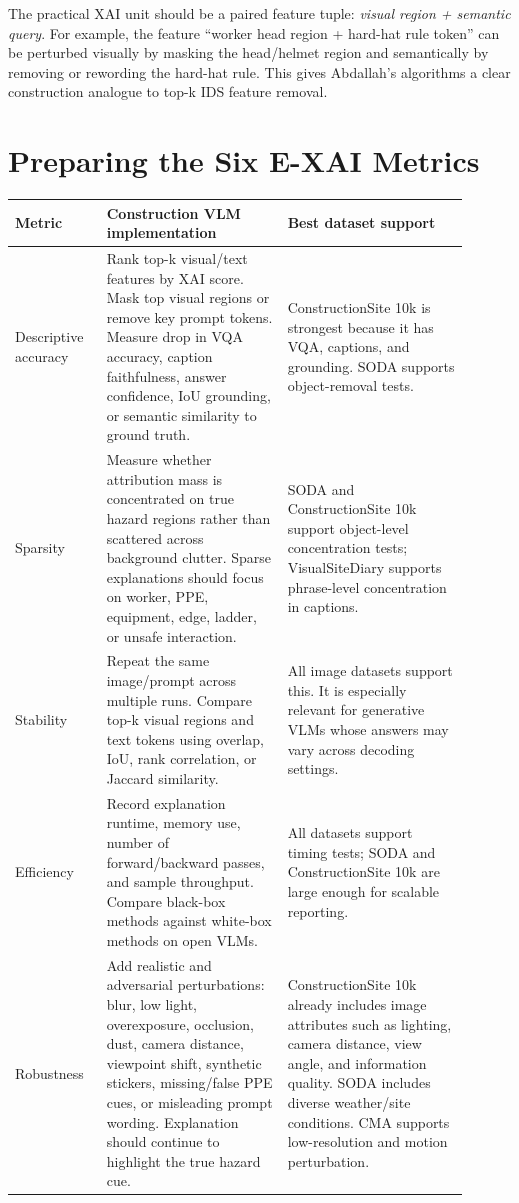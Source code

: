 \documentclass[10pt]{article}
\begin{document}
The practical XAI unit should be a paired feature tuple: \textit{visual region + semantic query}. For example, the feature ``worker head region + hard-hat rule token'' can be perturbed visually by masking the head/helmet region and semantically by removing or rewording the hard-hat rule. This gives Abdallah's algorithms a clear construction analogue to top-k IDS feature removal.

\section{Preparing the Six E-XAI Metrics}
\begin{longtable}{L{0.18\linewidth} L{0.36\linewidth} L{0.36\linewidth}}
\toprule
\textbf{Metric} & \textbf{Construction VLM implementation} & \textbf{Best dataset support} \\
\midrule
\endhead
Descriptive accuracy & Rank top-k visual/text features by XAI score. Mask top visual regions or remove key prompt tokens. Measure drop in VQA accuracy, caption faithfulness, answer confidence, IoU grounding, or semantic similarity to ground truth. & ConstructionSite 10k is strongest because it has VQA, captions, and grounding. SODA supports object-removal tests. \\
\midrule
Sparsity & Measure whether attribution mass is concentrated on true hazard regions rather than scattered across background clutter. Sparse explanations should focus on worker, PPE, equipment, edge, ladder, or unsafe interaction. & SODA and ConstructionSite 10k support object-level concentration tests; VisualSiteDiary supports phrase-level concentration in captions. \\
\midrule
Stability & Repeat the same image/prompt across multiple runs. Compare top-k visual regions and text tokens using overlap, IoU, rank correlation, or Jaccard similarity. & All image datasets support this. It is especially relevant for generative VLMs whose answers may vary across decoding settings. \\
\midrule
Efficiency & Record explanation runtime, memory use, number of forward/backward passes, and sample throughput. Compare black-box methods against white-box methods on open VLMs. & All datasets support timing tests; SODA and ConstructionSite 10k are large enough for scalable reporting. \\
\midrule
Robustness & Add realistic and adversarial perturbations: blur, low light, overexposure, occlusion, dust, camera distance, viewpoint shift, synthetic stickers, missing/false PPE cues, or misleading prompt wording. Explanation should continue to highlight the true hazard cue. & ConstructionSite 10k already includes image attributes such as lighting, camera distance, view angle, and information quality. SODA includes diverse weather/site conditions. CMA supports low-resolution and motion perturbation. \\

\end{longtable}
\end{document}
